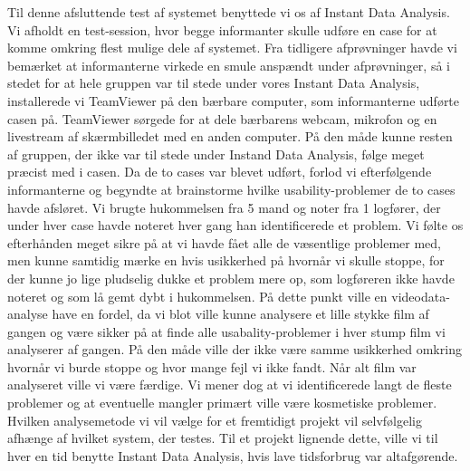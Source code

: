 Til denne afsluttende test af systemet benyttede vi os af Instant Data Analysis. Vi afholdt en test-session, hvor begge informanter skulle udføre en case for at komme omkring flest mulige dele af systemet. Fra tidligere afprøvninger havde vi bemærket at informanterne virkede en smule anspændt under afprøvninger, så i stedet for at hele gruppen var til stede under vores Instant Data Analysis, installerede vi TeamViewer på den bærbare computer, som informanterne udførte casen på. TeamViewer sørgede for at dele bærbarens webcam, mikrofon og en livestream af skærmbilledet med en anden computer. På den måde kunne resten af gruppen, der ikke var til stede under Instand Data Analysis, følge meget præcist med i casen.
Da de to cases var blevet udført, forlod vi efterfølgende informanterne og begyndte at brainstorme hvilke usability-problemer de to cases havde afsløret. Vi brugte hukommelsen fra 5 mand og noter fra 1 logfører, der under hver case havde noteret hver gang han identificerede et problem. Vi følte os efterhånden meget sikre på at vi havde fået alle de væsentlige problemer med, men kunne samtidig mærke en hvis usikkerhed på hvornår vi skulle stoppe, for der kunne jo lige pludselig dukke et problem mere op, som logføreren ikke havde noteret og som lå gemt dybt i hukommelsen. På dette punkt ville en videodata-analyse have en fordel, da vi blot ville kunne analysere et lille stykke film af gangen og være sikker på at finde alle usabality-problemer i hver stump film vi analyserer af gangen. På den måde ville der ikke være samme usikkerhed omkring hvornår vi burde stoppe og hvor mange fejl vi ikke fandt. Når alt film var analyseret ville vi være færdige. Vi mener dog at vi identificerede langt de fleste problemer og at eventuelle mangler primært ville være kosmetiske problemer. Hvilken analysemetode vi vil vælge for et fremtidigt projekt vil selvfølgelig afhænge af hvilket system, der testes. Til et projekt lignende dette, ville vi til hver en tid benytte Instant Data Analysis, hvis lave tidsforbrug var altafgørende.